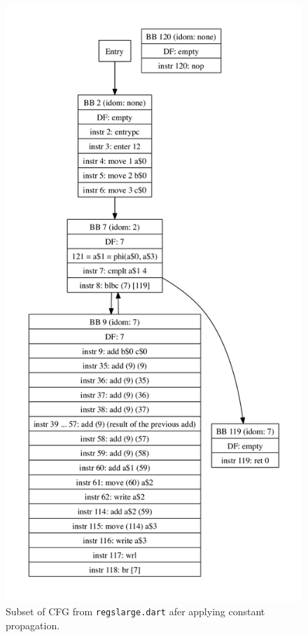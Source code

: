 \documentclass[10pt,twocolumn]{article}
\begin{document}
\begin{figure}
\begin{center}
\vspace{-1in}
  \includegraphics[height=0.75\paperheight]{figs/andre2.pdf}
\begin{minipage}{0.95\columnwidth}
  \caption{\label{fig:regslarge-scp} Subset of CFG from \texttt{regslarge.dart} afer applying constant propagation.}
\end{minipage}
\end{center}
\end{figure}
\end{document}
